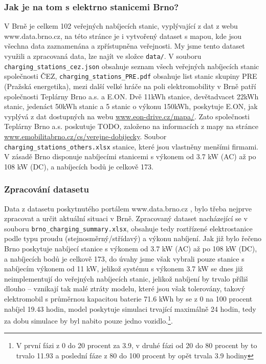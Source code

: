 \documentclass[a4paper,11pt]{article}
\begin{document}
\subsubsection{Jak je na tom s elektrno stanicemi Brno?}
V Brně je celkem 102 veřejných nabíjecích stanic, vyplývající z dat z webu www.data.brno.cz\cite{data_brno},
na této stránce je i vytvořený dataset s mapou, kde jsou všechna data zaznamenána a zpřístupněna veřejnosti.
My jsme tento dataset využili a zpracovaná data, lze najít ve složce \texttt{data/}. V souboru \texttt{charging\_stations\_cez.json}
obsahuje seznam všech veřejných nabíjecích stanic společnosti ČEZ, \texttt{charging\_stations\_PRE.pdf} obsahuje
list stanic skupiny PRE (Pražská energetika), mezi další velké hráče na poli elektromobility v Brně patří společnosti
Teplárny Brno a.s. a E.ON. Dvě 11kWh stanice, devětadvacet 22kWh stanic, jedenáct 50kWh stanic a 5 stanic o výkonu 150kWh, 
poskytuje E.ON, jak vyplývá z dat dostupných na webu \href{https://www.eon-drive.cz/mapa/}{www.eon-drive.cz/mapa/}.
Zato společnosti Teplárny Brno a.s. poskutuje TODO, založeno na informacích z mapy na stránce \href{https://www.emobilitabrno.cz/cs/verejne-dobijecky}{www.emobilitabrno.cz/cs/verejne-dobijecky}.
Soubor \texttt{charging\_stations\_others.xlsx} stanice, které jsou vlastněny menšími firmami.
V zásadě Brno disponuje nabíjecími stanicemi s výkonem od 3.7 kW (AC) až po 108 kW (DC), a nabíjecích bodů je 
celkově 173. \cite{eon_data, emobilita_data}

\subsubsection{Zpracování datasetu}
Data z datasetu poskytnutého portálem www.data.brno.cz \cite{data_brno}, bylo třeba nejprve zpracovat a určit 
aktuální situaci v Brně. Zpracovaný dataset nacházející se v souboru \texttt{brno\_charging\_summary.xlsx},
obsahuje tedy roztřízené elektrostanice podle typu proudu (stejnosměrný/střídavý) a výkonu nabíjení. Jak již bylo
řečeno Brno poskytuje nabíjecí stanice s výkonem od 3.7 kW (AC) až po 108 kW (DC), a nabíjecích bodů je celkově 173,
do úvahy jsme však vybrali pouze stanice s nabíjecím výkonem od 11 kW, jelikož systému s výkonem 3.7 kW se dnes již 
neimplementují do veřejných nabíjecích stanic, jelikož nabíjení by trvalo příliš dlouho -- vznikají tak malé ztráty
modelu, které jsou však tolerovány, takový elektromobil s průměrnou kapacitou baterie 71.6 kWh by se z 0 na 100 procent 
nabíjel 19.43 hodin, model poskytuje simulaci trvající maximálně 24 hodin, tedy za dobu simulace by byl nabito pouze jedno
vozidlo.\footnote{V první fázi z 0 do 20 procent za 3.9, v druhé fázi od 20 do 80 procent by to trvalo 11.93 a poslední 
fáze z 80 do 100 procent by opět trvala 3.9 hodiny}.
\end{document}
